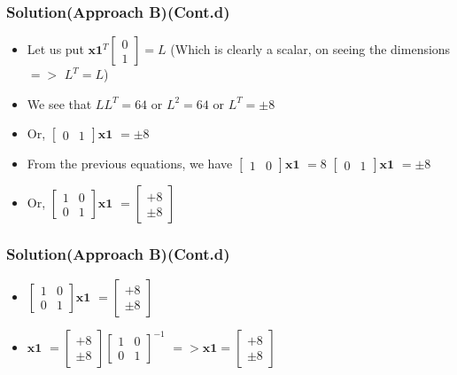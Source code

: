 \documentclass{beamer}
\begin{document}
\begin{frame}
\frametitle{Solution(Approach B)(Cont.d)}
\begin{itemize}
	\item<1-> Let us put $\mathbf{x1}^T \begin{bmatrix}0 \\ 1
	\end{bmatrix}= L$
	(Which is clearly a scalar, on seeing the dimensions $=>$ $L^{T} = L$)
	\item<2-> We see that $LL^{T} = 64$ or $L^{2} = 64$ or $ L^{T} = \pm 8 $
	\item<3-> Or, $\begin{bmatrix} 0 & 1
	\end{bmatrix} \mathbf{x1}$  $ = \pm 8$
	\item<3-> From the previous equations, we  have \newline \newline
	$\begin{bmatrix} 1 & 0
	\end{bmatrix} \mathbf{x1}$  $ = 8$
	\newline \newline
	$\begin{bmatrix} 0 & 1
	\end{bmatrix} \mathbf{x1}$  $ = \pm 8$ \newline
	\item<4-> Or, \newline \newline$\begin{bmatrix} 1 & 0 \\ 0 & 1
	\end{bmatrix} \mathbf{x1}$  $ =  \begin{bmatrix} +8 \\ \pm 8
	\end{bmatrix}$
\end{itemize}
\end{frame}

\begin{frame}
\frametitle{Solution(Approach B)(Cont.d)}
\begin{itemize}
	\item<1-> $\begin{bmatrix} 1 & 0 \\ 0 & 1
	\end{bmatrix} \mathbf{x1}$  $ =  \begin{bmatrix} +8 \\ \pm 8
	\end{bmatrix}$
	\item<2-> $\mathbf{x1}$  $ =  \begin{bmatrix} +8 \\ \pm 8
	\end{bmatrix}\begin{bmatrix} 1 & 0 \\ 0 & 1
	\end{bmatrix}^{-1}$ $ => \mathbf{x1} = \begin{bmatrix} +8 \\ \pm 8
	\end{bmatrix}$
\end{itemize}
\end{frame}
\end{document}
